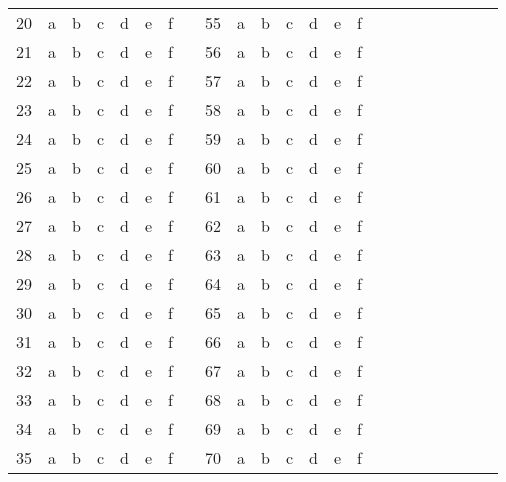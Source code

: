 \documentclass[amsfonts,bezier,leqno,fleqn,12pt,a4paper]{article}
\begin{document}
{{{{\begin{normalsize}
\begin{center}
\begin{tabular}{|c|c c c c c c|c|c|c c c c c c|c|c|c c c c c c|}
20 & a & b & c & d & e & f & & 55& a & b & c & d & e & f\\ \cline{1-7}\cline{9-15}
21 & a & b & c & d & e & f & & 56& a & b & c & d & e & f\\ \cline{1-7}\cline{9-15}
22 & a & b & c & d & e & f & & 57& a & b & c & d & e & f\\ \cline{1-7}\cline{9-15}
23 & a & b & c & d & e & f & & 58& a & b & c & d & e & f\\ \cline{1-7}\cline{9-15}
24 & a & b & c & d & e & f & & 59& a & b & c & d & e & f\\ \cline{1-7}\cline{9-15}
25 & a & b & c & d & e & f & & 60& a & b & c & d & e & f\\ \cline{1-7}\cline{9-15}
26 & a & b & c & d & e & f & & 61& a & b & c & d & e & f\\ \cline{1-7}\cline{9-15}
27 & a & b & c & d & e & f & & 62& a & b & c & d & e & f\\ \cline{1-7}\cline{9-15}
28 & a & b & c & d & e & f & & 63& a & b & c & d & e & f\\ \cline{1-7}\cline{9-15}
29 & a & b & c & d & e & f & & 64& a & b & c & d & e & f\\ \cline{1-7}\cline{9-15}
30 & a & b & c & d & e & f & & 65& a & b & c & d & e & f\\ \cline{1-7}\cline{9-15}
31 & a & b & c & d & e & f & & 66& a & b & c & d & e & f\\ \cline{1-7}\cline{9-15}
32 & a & b & c & d & e & f & & 67& a & b & c & d & e & f\\ \cline{1-7}\cline{9-15}
33 & a & b & c & d & e & f & & 68& a & b & c & d & e & f\\ \cline{1-7}\cline{9-15}
34 & a & b & c & d & e & f & & 69& a & b & c & d & e & f\\ \cline{1-7}\cline{9-15}
35 & a & b & c & d & e & f & & 70& a & b & c & d & e & f\\ \cline{1-7}\cline{9-15}
\end{tabular}\end{center}
\end{normalsize}
\newpage
\renewcommand{\thepage}{\noindent Math 101, Final Exam, Term 162 \hfill \arabic{page} \hfill {\bf \fbox{ANSWER KEY}}}
\begin{normalsize}
\setcounter{page}{1}
\vspace {1cm}



\end{normalsize}}}}}
\end{document}
